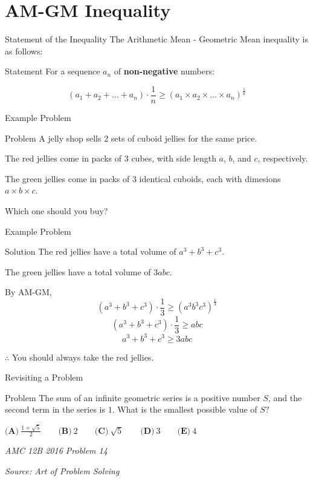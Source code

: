 \section{AM-GM Inequality}
\begin{namedframe}{Statement of the Inequality}
	The Arithmetic Mean - Geometric Mean inequality is as follows:

	\begin{block}{Statement}
		For a sequence $a_n$ of \textbf{non-negative} numbers:

		\[\left(a_1 + a_2 + ... + a_n\right) \cdot \frac{1}{n} \geq (a_1 \times a_2 \times  ... \times a_n)^{\frac{1}{n}} \]
	\end{block}
\end{namedframe}

\begin{namedframe}{Example Problem}
	\begin{exampleblock}{Problem}
		A jelly shop sells 2 sets of cuboid jellies for the same price.
		
		The red jellies come in packs of $3$ cubes, with side length $a$, $b$, and $c$, respectively.

		The green jellies come in packs of $3$ identical cuboids, each with dimesions $a \times b \times c$.

		Which one should you buy?
	\end{exampleblock}
\end{namedframe}

\begin{namedframe}{Example Problem}
	\begin{block}{Solution}
		The red jellies have a total volume of $a^3 + b^3 + c^3$.

		The green jellies have a total volume of $3abc$.

		By AM-GM,
		\[(a^3 + b^3 + c^3) \cdot \frac{1}{3} \geq \left( a^3b^3c^3 \right) ^ {\frac{1}{3}} \]
		\[(a^3 + b^3 + c^3) \cdot \frac{1}{3} \geq abc \]
		\[a^3 + b^3 + c^3 \geq 3abc \]

		$\therefore$ You should always take the red jellies.
	\end{block}
\end{namedframe}

\begin{namedframe}{Revisiting a Problem}
	\begin{exampleblock}{Problem}
		The sum of an infinite geometric series is a positive number $S$, and the second term in the series is $1$. What is the smallest possible value of $S?$

		\phantom{ }

		$\textbf{(A)}\ \frac{1+\sqrt{5}}{2} \qquad \textbf{(B)}\ 2 \qquad \textbf{(C)}\ \sqrt{5} \qquad \textbf{(D)}\ 3 \qquad \textbf{(E)}\ 4$

		\phantom{ }

		\textit{AMC 12B 2016 Problem 14}

		\textit{Source: Art of Problem Solving}
	\end{exampleblock}
\end{namedframe}

